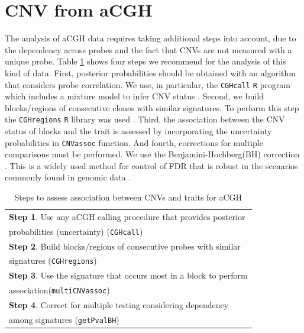 \documentclass[11pt]{article}
\begin{document}
\section{CNV from aCGH} \label{section-CNV from aCGH}

The analysis of aCGH data requires taking additional steps into account, due to the dependency across probes and the fact that CNVs 
are not measured with a unique probe. Table \ref{tab-stepsCGH} shows four steps we recommend for the analysis of this kind of data. 
First, posterior probabilities should be obtained with an algorithm that considers probe correlation. We use, in particular, 
the {\tt CGHcall} {\tt R} program which includes a mixture model to infer CNV status \cite{vanKimVos07}. Second, we build blocks/regions 
of consecutive clones with similar signatures. To perform this step the {\tt CGHregions} {\tt R} library was used \cite{WieWie07}. 
Third, the association between the CNV status of blocks and the trait is assessed by incorporating the uncertainty probabilities 
in {\tt CNVassoc} function. And fourth, corrections for multiple comparisons must be performed. We use the Benjamini-Hochberg(BH) 
correction \cite{BenHoc95}. 
This is a widely used method for control of FDR that is robust in the scenarios commonly found in genomic data \cite{Reiner}.


\begin{table}[ht]
\begin{center}
\caption{Steps to assess association between CNVs and traits for aCGH} \label{tab-stepsCGH}
\begin{tabular}{l}
\hline \hline
{\bf Step 1}. Use any aCGH calling procedure that provides posterior \\  \hspace{1.4 cm} probabilities (uncertainty) ({\tt CGHcall}) \\
{\bf Step 2}. Build blocks/regions of consecutive probes with similar \\ \hspace{1.4 cm} signatures ({\tt CGHregions}) \\
{\bf Step 3}. Use the signature that occurs most in a block to perform \\ \hspace{1.4 cm} association({\tt multiCNVassoc}) \\
{\bf Step 4}. Correct for multiple testing considering dependency \\ \hspace{1.4 cm} among signatures ({\tt getPvalBH}) \\
\hline \hline
\end{tabular}
\end{center}
\end{table}
\end{document}
